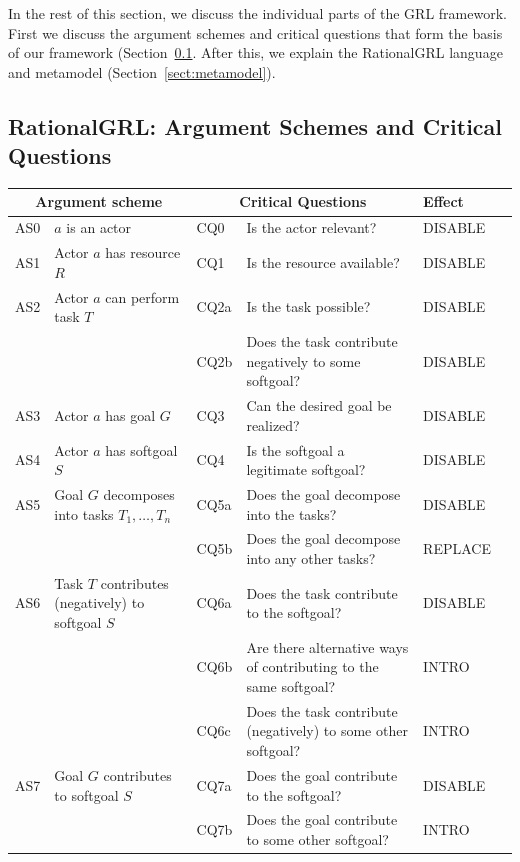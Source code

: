 In the rest of this section, we discuss the individual parts of the GRL framework. First we discuss the argument schemes and critical questions that form the basis of our framework (Section~\ref{sect:overview:as}. After this, we explain the RationalGRL language and metamodel (Section~\ref{sect:metamodel}). 

\subsection{RationalGRL: Argument Schemes and Critical Questions}
\label{sect:overview:as}

\begin{table}[t]
\centering
\begin{tabularx}{\textwidth}{|l|l|l|X|l|l|}
\hline
\multicolumn{2}{|c|}{\textbf{Argument scheme}} & \multicolumn{2}{c|}{\textbf{Critical Questions}} & \textbf{Effect}\\
\hline
AS0 & $a$ is an actor & CQ0 & Is the actor relevant? & DISABLE\\
\hline
AS1 & Actor $a$ has resource $R$ & CQ1 &Is the resource available? & DISABLE\\
\hline
AS2 & Actor $a$ can perform task $T$ & CQ2a &Is the task possible? & DISABLE\\
&& CQ2b & Does the task contribute negatively to some softgoal? & DISABLE\\
\hline
AS3 & Actor $a$ has goal $G$ & CQ3 & Can the desired goal be realized? & DISABLE\\
\hline
AS4 & Actor $a$ has softgoal $S$ & CQ4 & Is the softgoal a legitimate softgoal?& DISABLE\\
\hline
\hline
AS5 & Goal $G$ decomposes into tasks $T_1,\ldots,T_n$ & CQ5a & Does the goal decompose into the tasks?& DISABLE\\
& & CQ5b & Does the goal decompose into any other tasks?& REPLACE\\
\hline
AS6 & Task $T$ contributes (negatively) to softgoal $S$& CQ6a & Does the task contribute to the softgoal?& DISABLE\\
&& CQ6b & Are there alternative ways of contributing to the same softgoal?& INTRO \\
&& CQ6c & Does the task contribute (negatively) to some other softgoal?& INTRO\\
\hline
AS7 & Goal $G$ contributes to softgoal $S$ & CQ7a & Does the goal contribute to the softgoal?& DISABLE\\
&& CQ7b & Does the goal contribute to some other softgoal?& INTRO\\

\end{tabularx}
\end{table}
